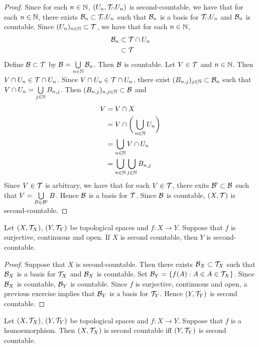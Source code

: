 \documentclass{book}
\begin{document}
	\begin{proof}
		Since for each $n \in \mathbb{N}$, $(U_n, \mathcal{T}_ \cap U_n)$ is second-countable, we have that for each $n \in \mathbb{N}$, there exists $\mathcal{B}_n \subset \mathcal{T}_ \cap U_n$ such that $\mathcal{B}_n$ is a basis for $\mathcal{T}_ \cap U_n$ and $\mathcal{B}_n$ is countable. Since $(U_n)_{n \in \mathbb{N}} \subset \mathcal{T}$, we have that for each $n \in \mathbb{N}$,
		\begin{align*}
			\mathcal{B}_n 
			& \subset \mathcal{T} \cap U_n \\
			& \subset \mathcal{T} 
		\end{align*}
		Define $\mathcal{B} \subset \mathcal{T}$ by $\mathcal{B} = \bigcup\limits_{n \in \mathbb{N}} \mathcal{B}_n$. Then $\mathcal{B}$ is countable. 
		Let $V \in \mathcal{T}$ and $n \in \mathbb{N}$. Then $V \cap U_n \in \mathcal{T} \cap U_n$. Since $V \cap U_n \in \mathcal{T} \cap U_n$, there exist $(B_{n, j})_{j \in \mathbb{N}} \subset \mathcal{B}_n$ such that $V \cap U_n = \bigcup\limits_{j \in \mathbb{N}} B_{n,j}$.
		Then $(B_{n,j})_{n,j \in \mathbb{N}} \subset \mathcal{B}$ and 
		\begin{align*}
			V
			& = V \cap X \\
			& = V \cap \bigg( \bigcup_{n \in \mathbb{N}} U_n \bigg) \\
			& = \bigcup_{n \in \mathbb{N}} V \cap U_n \\
			& = \bigcup_{n \in \mathbb{N}} \bigcup_{j \in \mathbb{N}} B_{n,j} 
		\end{align*}
		Since $V \in \mathcal{T}$ is arbitrary, we have that for each $V \in \mathcal{T}$, there exits $\mathcal{B}' \subset \mathcal{B}$ such that $V = \bigcup\limits_{B \in \mathcal{B}'} B$. Hence $\mathcal{B}$ is a basis for $\mathcal{T}$. Since $\mathcal{B}$ is countable, $(X, \mathcal{T})$ is second-countable.
	\end{proof}

	\begin{ex} 
		Let $(X, \mathcal{T}_X)$, $(Y, \mathcal{T}_Y)$ be topological spaces and $f:X \rightarrow Y$. Suppose that $f$ is surjective, continuous and open. If $X$ is second countable, then $Y$ is second-countable. 
	\end{ex}

	\begin{proof}
		Suppose that $X$ is second-countable. Then there exists $\mathcal{B}_X \subset \mathcal{T}_X$ such that $\mathcal{B}_X$ is a basis for $\mathcal{T}_X$ and $\mathcal{B}_X$ is countable. Set $\mathcal{B}_{Y} = \{f(A):A \in A \in \mathcal{T}_X\}$. Since $\mathcal{B}_X$ is countable, $\mathcal{B}_Y$ is countable. Since $f$ is surjective, continuous and open, a previous exercise implies that $\mathcal{B}_{Y}$ is a basis for $\mathcal{T}_Y$. Hence $(Y, \mathcal{T}_Y)$ is second countable.
	\end{proof}

	\begin{ex} 
		Let $(X, \mathcal{T}_X)$, $(Y, \mathcal{T}_Y)$ be topological spaces and $f:X \rightarrow Y$. Suppose that $f$ is a homoemorphism. Then $(X, \mathcal{T}_X)$ is second countable iff $(Y, \mathcal{T}_Y)$ is second countable.
	\end{ex}
\end{document}
